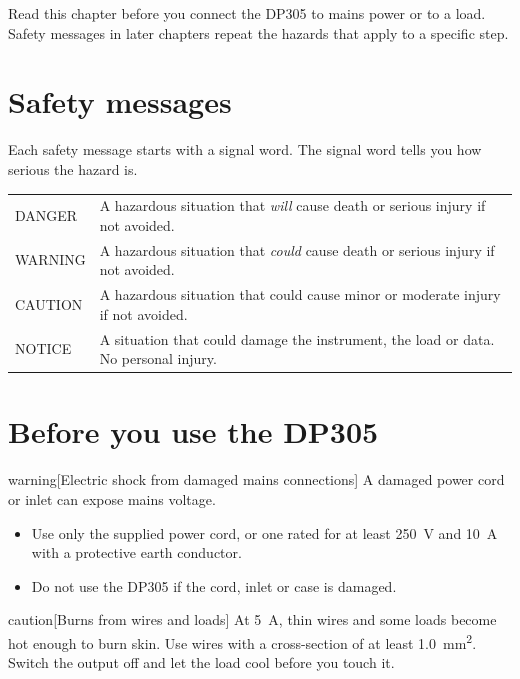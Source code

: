 \documentclass[type=manual, lang=en-GB, otherlangs={zh-HK}]{plaindoc}
\begin{document}
Read this chapter before you connect the DP305 to mains power or to a load.
Safety messages in later chapters repeat the hazards that apply to a
specific step.

\section{Safety messages}

Each safety message starts with a signal word. The signal word tells you how
serious the hazard is.

\begin{tabularx}{\linewidth}{@{}P{30mm}L@{}}
\toprule
{} &  \\
\midrule
DANGER  & A hazardous situation that \emph{will} cause death or serious injury if not avoided. \\
WARNING & A hazardous situation that \emph{could} cause death or serious injury if not avoided. \\
CAUTION & A hazardous situation that could cause minor or moderate injury if not avoided. \\
NOTICE  & A situation that could damage the instrument, the load or data. No personal injury. \\
\bottomrule
\end{tabularx}

\section{Before you use the DP305}

\begin{safety}{warning}[Electric shock from damaged mains connections]
A damaged power cord or inlet can expose mains voltage.
\begin{itemize}
\item Use only the supplied power cord, or one rated for at least
      \qty{250}{\volt} and \qty{10}{\ampere} with a protective earth conductor.
\item Do not use the DP305 if the cord, inlet or case is damaged.
\end{itemize}
\end{safety}

\begin{safety}{caution}[Burns from wires and loads]
At \qty{5}{\ampere}, thin wires and some loads become hot enough to burn skin.
Use wires with a cross-section of at least \qty{1.0}{\mm\squared}.
Switch the output off and let the load cool before you touch it.
\end{safety}
\end{document}

